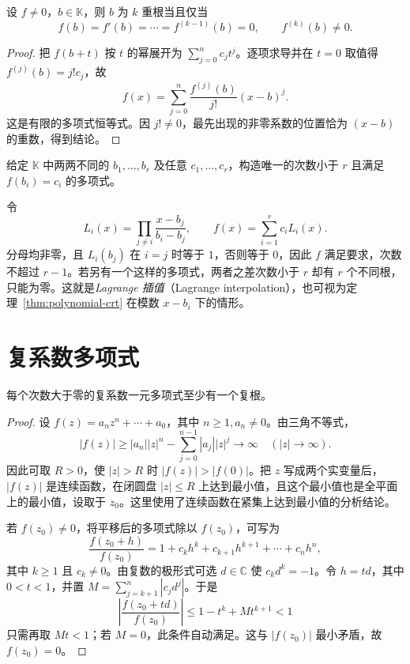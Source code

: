 \begin{proposition}
\label{prop:polynomial-root-derivatives}
设 $f\ne0$，$b\in\mathbb K$，则 $b$ 为 $k$ 重根当且仅当
\[
    f(b)=f'(b)=\cdots=f^{(k-1)}(b)=0,
    \qquad f^{(k)}(b)\ne0.
\]
\end{proposition}
\begin{proof}
把 $f(b+t)$ 按 $t$ 的幂展开为 $\sum_{j=0}^n c_jt^j$。逐项求导并在 $t=0$ 取值得 $f^{(j)}(b)=j!c_j$，故
\[
    f(x)=\sum_{j=0}^n\frac{f^{(j)}(b)}{j!}(x-b)^j.
\]
这是有限的多项式恒等式。因 $j!\ne0$，最先出现的非零系数的位置恰为 $(x-b)$ 的重数，得到结论。
\end{proof}

\begin{example}
\label{ex:polynomial-interpolation}
给定 $\mathbb K$ 中两两不同的 $b_1,\ldots,b_r$ 及任意 $c_1,\ldots,c_r$，构造唯一的次数小于 $r$ 且满足 $f(b_i)=c_i$ 的多项式。
\end{example}
\begin{solve}
令
\[
    L_i(x)=\prod_{j\ne i}\frac{x-b_j}{b_i-b_j},
    \qquad f(x)=\sum_{i=1}^r c_iL_i(x).
\]
分母均非零，且 $L_i(b_j)$ 在 $i=j$ 时等于 $1$，否则等于 $0$，因此 $f$ 满足要求，次数不超过 $r-1$。若另有一个这样的多项式，两者之差次数小于 $r$ 却有 $r$ 个不同根，只能为零。这就是\emph{Lagrange 插值}（Lagrange interpolation），也可视为定理~\ref{thm:polynomial-crt} 在模数 $x-b_i$ 下的情形。
\end{solve}

\section{复系数多项式}
\label{sec:complex-polynomials}

\begin{theorem}[代数基本定理]
\label{thm:fundamental-theorem-algebra}
每个次数大于零的复系数一元多项式至少有一个复根。
\end{theorem}
\begin{proof}
设 $f(z)=a_nz^n+\cdots+a_0$，其中 $n\geq1,a_n\ne0$。由三角不等式，
\[
    |f(z)|\geq |a_n||z|^n-\sum_{j=0}^{n-1}|a_j||z|^j\longrightarrow\infty
    \quad (|z|\longrightarrow\infty).
\]
因此可取 $R>0$，使 $|z|>R$ 时 $|f(z)|>|f(0)|$。把 $z$ 写成两个实变量后，$|f(z)|$ 是连续函数，在闭圆盘 $|z|\leq R$ 上达到最小值，且这个最小值也是全平面上的最小值，设取于 $z_0$。这里使用了连续函数在紧集上达到最小值的分析结论。

若 $f(z_0)\ne0$，将平移后的多项式除以 $f(z_0)$，可写为
\[
    \frac{f(z_0+h)}{f(z_0)}=1+c_kh^k+c_{k+1}h^{k+1}+\cdots+c_nh^n,
\]
其中 $k\geq1$ 且 $c_k\ne0$。由复数的极形式可选 $d\in\mathbb C$ 使 $c_kd^k=-1$。令 $h=td$，其中 $0<t<1$，并置 $M=\sum_{j=k+1}^n|c_jd^j|$。于是
\[
    \left|\frac{f(z_0+td)}{f(z_0)}\right|
    \leq 1-t^k+Mt^{k+1}<1
\]
只需再取 $Mt<1$；若 $M=0$，此条件自动满足。这与 $|f(z_0)|$ 最小矛盾，故 $f(z_0)=0$。
\end{proof}

